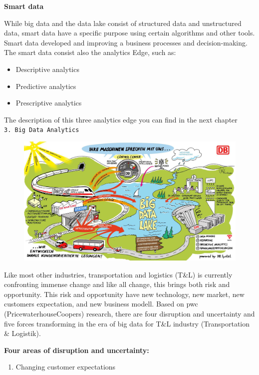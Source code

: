 \documentclass[]{book}
\providecommand{\tightlist}{%
  \setlength{\itemsep}{0pt}\setlength{\parskip}{0pt}}
\begin{document}
\textbf{Smart data}

While big data and the data lake consist of structured data and
unstructured data, smart data have a specific purpose using certain
algorithms and other tools. Smart data developed and improving a
business processes and decision-making. The smart data consist also the
analytics Edge, such as:

\begin{itemize}
\tightlist
\item
  Descriptive analytics
\item
  Predictive analytics
\item
  Prescriptive analytics
\end{itemize}

The description of this three analytics edge you can find in the next
chapter \texttt{3.\ Big\ Data\ Analytics}

\begin{figure}
\centering
\includegraphics{dbbigdata.jpg}
\caption{}
\end{figure}

Like most other industries, transportation and logistics (T\&L) is
currently confronting immense change and like all change, this brings
both risk and opportunity. This risk and opportunity have new
technology, new market, new customers expectation, and new business
modell. Based on pwc (PricewaterhouseCoopers) research, there are four
disruption and uncertainty and five forces transforming in the era of
big data for T\&L industry (Transportation \& Logistik).

\textbf{Four areas of disruption and uncertainty:}

\begin{enumerate}
\def\labelenumi{\arabic{enumi}.}
\tightlist
\item
  Changing customer expectations
\end{enumerate}
\end{document}
